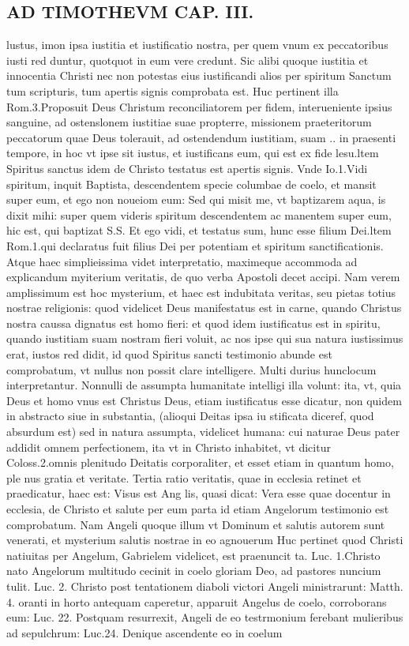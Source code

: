 \documentclass{article}
\begin{document}
\begin{pages}
\section*{AD TIMOTHEVM CAP. III. }
\marginpar{[ p.89 ]}\pstart lustus, imon ipsa iustitia et iustificatio nostra, per quem vnum ex peccatoribus iusti red duntur, quotquot in eum vere credunt. Sic alibi quoque iustitia et innocentia Christi nec non potestas eius iustificandi alios per spiritum Sanctum tum scripturis, tum apertis signis comprobata est. Huc pertinent illa Rom.3.Proposuit Deus Christum reconciliatorem per fidem, interueniente ipsius sanguine, ad ostenslonem iustitiae suae propterre, missionem praeteritorum peccatorum quae Deus tolerauit, ad ostendendum iustitiam, suam .. in praesenti tempore, in hoc vt ipse sit iustus, et iustificans eum, qui est ex fide lesu.ltem Spiritus sanctus idem de Christo testatus est apertis signis. Vnde Io.1.Vidi spiritum, inquit Baptista, descendentem specie columbae de coelo, et mansit super eum, et ego non noueiom eum: Sed qui misit me, vt baptizarem aqua, is dixit mihi: super quem videris spiritum descendentem ac manentem super eum, hic est, qui baptizat S.S. Et ego vidi, et testatus sum, hunc esse filium Dei.ltem Rom.1.qui declaratus fuit filius Dei per potentiam et spiritum sanctificationis. Atque haec simplieissima videt interpretatio, maximeque accommoda ad explicandum myiterium veritatis, de quo verba Apostoli decet accipi. Nam verem amplissimum est hoc mysterium, et haec est indubitata veritas, seu pietas totius nostrae religionis: quod videlicet Deus manifestatus est in carne, quando Christus nostra caussa dignatus est homo fieri: et quod idem iustificatus est in spiritu, quando iustitiam suam nostram fieri voluit, ac nos ipse qui sua natura iustissimus erat, iustos red didit, id quod Spiritus sancti testimonio abunde est comprobatum, vt nullus non possit clare intelligere. Multi durius hunclocum interpretantur. Nonnulli de assumpta humanitate intelligi illa volunt: ita, vt, quia Deus et homo vnus est Christus Deus, etiam iustificatus esse dicatur, non quidem in abstracto siue in substantia, (alioqui Deitas ipsa iu stificata diceref, quod absurdum est) sed in natura assumpta, videlicet humana: cui naturae Deus pater addidit omnem perfectionem, ita vt in Christo inhabitet, vt dicitur Coloss.2.omnis plenitudo Deitatis corporaliter, et esset etiam in quantum homo, ple nus gratia et veritate.  \pend\pstart Tertia ratio veritatis, quae in ecclesia retinet et praedicatur, haec est: Visus est Ang lis, quasi dicat: Vera esse quae docentur in ecclesia, de Christo et salute per eum parta id etiam Angelorum testimonio est comprobatum. Nam Angeli quoque illum vt Dominum et salutis autorem sunt venerati, et mysterium salutis nostrae in eo agnouerum Huc pertinet quod Christi natiuitas per Angelum, Gabrielem videlicet, est praenuncit ta. Luc. 1.Christo nato Angelorum multitudo cecinit in coelo gloriam Deo, ad pastores nuncium tulit. Luc. 2. Christo post tentationem diaboli victori Angeli ministrarunt: Matth. 4. oranti in horto antequam caperetur, apparuit Angelus de coelo, corroborans eum: Luc. 22. Postquam resurrexit, Angeli de eo testrmonium ferebant mulieribus ad sepulchrum: Luc.24. Denique ascendente eo in coelum 
\end{pages}
\end{document}
